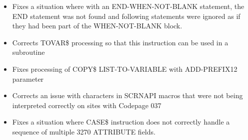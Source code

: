 \documentclass[letterpaper,10pt,english]{sphinxmanual}
\begin{document}
\begin{itemize}
\item {} 
Fixes a situation where with an END-WHEN-NOT-BLANK statement, the END statement was not found and following statements were ignored as if they had been part of the WHEN-NOT-BLANK block.

\end{itemize}

\begin{itemize}
\item {} 
Corrects TOVAR\$ processing so that this instruction can be used in a subroutine

\end{itemize}

\begin{itemize}
\item {} 
Fixes processing of COPY\$ LIST-TO-VARIABLE with ADD-PREFIX12 parameter

\end{itemize}

\begin{itemize}
\item {} 
Corrects an issue with characters in SCRNAPI macros that were not being interpreted correctly on sites with Codepage 037

\end{itemize}

\begin{itemize}
\item {} 
Fixes a situation where CASE\$ instruction does not correctly handle a sequence of multiple 3270 ATTRIBUTE fields.

\end{itemize}

\newpage
\end{document}
